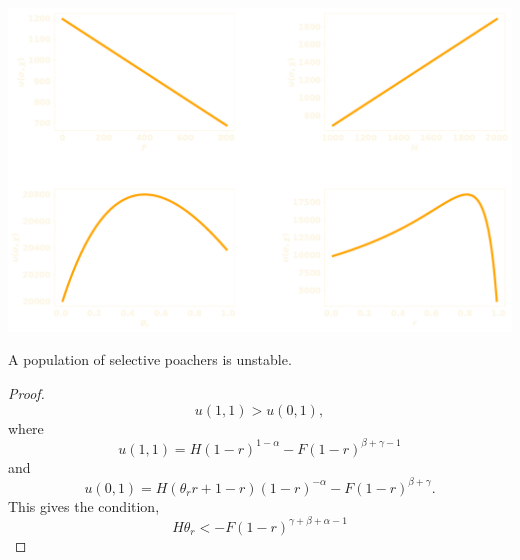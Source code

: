 \documentclass{beamer}
\begin{document}
\begin{frame}
    \begin{center}
    \includegraphics[width=.8\textwidth]{static/utility}
    \end{center}
\end{frame}

\begin{frame}
    \centering
    \large{
    \textcolor{orange}{
        }}
    \end{frame}

\begin{frame}
    \begin{center}
    
    \end{center}
\end{frame}
    
\begin{frame}
    \centering
    \footnotesize
    \begin{theorem}[Selective]
    A population of selective poachers is unstable.
    \end{theorem}

    \begin{proof}
    \[u(1, 1)  > u(0, 1),\]
    where
    \[u(1, 1) = H(1 - r)^{1 - \alpha} − F (1 - r)^{\beta + \gamma - 1}\]
    and
    \[u(0, 1) = H(\theta_{r} r + 1 - r)(1 - r)^{-\alpha} - F (1 - r)^{\beta + \gamma}.\]
    This gives the condition,
    \[H\theta_{r} < -F (1 - r)^{\gamma + \beta + \alpha -1}\]
    \end{proof}
\end{frame}
\end{document}
